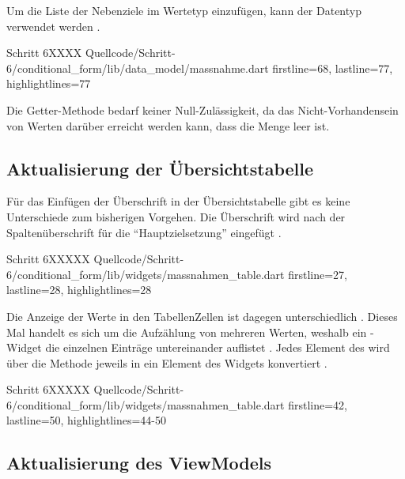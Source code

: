 Um die Liste der Nebenziele im Wertetyp  einzufügen,
kann der Datentyp  verwendet werden .
\begin{alexlisting}{Schritt 6}{XXXX}
  {Quellcode/Schritt-6/conditional_form/lib/data_model/massnahme.dart}
  {firstline=68, lastline=77, highlightlines={77}}
  \label{lst:Schritt6MassnahmenCharakteristika}
\end{alexlisting}
Die Getter-Methode  bedarf keiner Null-Zulässigkeit,
da das Nicht-Vorhandensein von Werten darüber erreicht werden kann,
dass die Menge leer ist.




\subsection{Aktualisierung der Übersichtstabelle}

Für das Einfügen der Überschrift in der Übersichtstabelle gibt es keine Unterschiede zum bisherigen Vorgehen.
Die Überschrift wird nach der Spaltenüberschrift für die \enquote{Hauptzielsetzung} eingefügt .

\begin{alexlisting}{Schritt 6}{XXXXX}
  {Quellcode/Schritt-6/conditional_form/lib/widgets/massnahmen_table.dart}
  {firstline=27, lastline=28, highlightlines={28}}
  \label{lst:Schritt6buildColumnHeader}
\end{alexlisting}

Die Anzeige der Werte in den TabellenZellen ist dagegen unterschiedlich \Lst{\ref{lst:Schritt6buildSelectableCell}}.
Dieses Mal handelt es sich um die Aufzählung von mehreren Werten,
weshalb ein -Widget die einzelnen Einträge untereinander auflistet .
Jedes Element des    wird über die Methode  jeweils in ein Element des Widgets  konvertiert .

\begin{alexlisting}{Schritt 6}{XXXXX}
  {Quellcode/Schritt-6/conditional_form/lib/widgets/massnahmen_table.dart}
  {firstline=42, lastline=50, highlightlines={44-50}}
  \label{lst:Schritt6buildSelectableCell}
\end{alexlisting}

\subsection{Aktualisierung des ViewModels}

